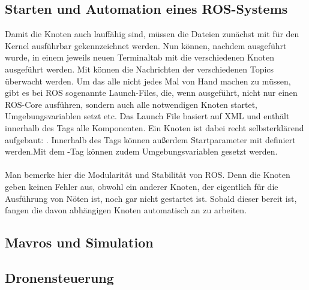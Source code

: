 \subsection{Starten und Automation eines ROS-Systems}
Damit die Knoten auch lauffähig sind, müssen die Dateien zunächst mit  für den Kernel ausführbar gekennzeichnet werden. Nun können, nachdem  ausgeführt wurde, in einem jeweils neuen Terminaltab mit  die verschiedenen Knoten ausgeführt werden. Mit  können die Nachrichten der verschiedenen Topics überwacht werden. Um das alle nicht jedes Mal von Hand machen zu müssen, gibt es bei ROS sogenannte Launch-Files, die, wenn ausgeführt, nicht nur einen ROS-Core ausführen, sondern auch alle notwendigen Knoten startet, Umgebungsvariablen setzt etc. Das Launch File basiert auf XML und enthält innerhalb des  Tags alle Komponenten. Ein Knoten ist dabei recht selbsterklärend aufgebaut: . Innerhalb des Tags können außerdem Startparameter mit  definiert werden.Mit dem -Tag können zudem Umgebungsvariablen gesetzt werden. 

\paragraph{}Man bemerke hier die Modularität und Stabilität von ROS. Denn die Knoten geben keinen Fehler aus, obwohl ein anderer Knoten, der eigentlich für die Ausführung von Nöten ist, noch gar nicht gestartet ist. Sobald dieser bereit ist, fangen die davon abhängigen Knoten automatisch an zu arbeiten. 

\subsection{Mavros und Simulation}
\subsection{Dronensteuerung}
